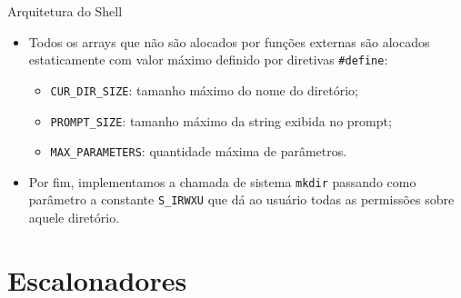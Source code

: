 \documentclass[10pt]{beamer}
\begin{document}
    \begin{frame}{Arquitetura do Shell}
      \begin{itemize}
        \justifying
        \item Todos os arrays que não são alocados por funções externas são alocados estaticamente com valor máximo definido por diretivas \texttt{\#define}:
        \begin{itemize}
          \vspace{-0.25in}
          \item \texttt{CUR\_DIR\_SIZE}: tamanho máximo do nome do diretório;
          \item \texttt{PROMPT\_SIZE}: tamanho máximo da string exibida no prompt;
          \item \texttt{MAX\_PARAMETERS}: quantidade máxima de parâmetros.
        \end{itemize}
        \item Por fim, implementamos a chamada de sistema \texttt{mkdir} passando como parâmetro a constante \texttt{S\_IRWXU} que dá ao usuário todas as permissões sobre aquele diretório.
      \end{itemize}
    \end{frame}
    \section{Escalonadores}
\end{document}
